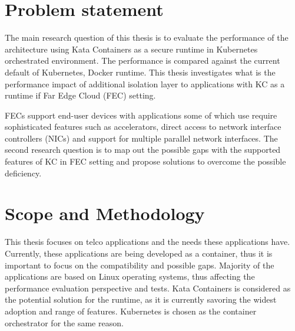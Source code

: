 \section{Problem statement}
\label{section:intro_problemstatement}

The main research question of this thesis is to evaluate the performance of the architecture using Kata Containers as a secure runtime in Kubernetes orchestrated environment. The performance is compared against the current default of Kubernetes, Docker runtime. This thesis investigates what is the performance impact of additional isolation layer to applications with KC as a runtime if Far Edge Cloud (FEC) setting.

FECs support end-user devices with applications some of which use require sophisticated features such as accelerators, direct access to network interface controllers (NICs) and support for multiple parallel network interfaces. The second research question is to map out the possible gaps with the supported features of KC in FEC setting and propose solutions to overcome the possible deficiency.





\section{Scope and Methodology}
\label{section:intro_scopemethodology}

This thesis focuses on telco applications and the needs these applications have. Currently, these applications are being developed as a container, thus it is important to focus on the compatibility and possible gaps. Majority of the applications are based on Linux operating systems, thus affecting the performance evaluation perspective and tests. Kata Containers is considered as the potential solution for the runtime, as it is currently savoring the widest adoption and range of features. Kubernetes is chosen as the container orchestrator for the same reason.

